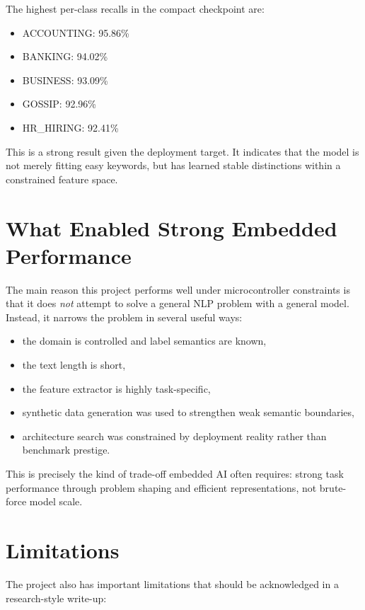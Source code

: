 \documentclass[11pt,a4paper]{article}
\begin{document}
The highest per-class recalls in the compact checkpoint are:

\begin{itemize}
    \item ACCOUNTING: 95.86\%
    \item BANKING: 94.02\%
    \item BUSINESS: 93.09\%
    \item GOSSIP: 92.96\%
    \item HR\_HIRING: 92.41\%
\end{itemize}

This is a strong result given the deployment target. It indicates that the model is not merely fitting easy keywords, but has learned stable distinctions within a constrained feature space.

\section{What Enabled Strong Embedded Performance}

The main reason this project performs well under microcontroller constraints is that it does \emph{not} attempt to solve a general NLP problem with a general model. Instead, it narrows the problem in several useful ways:

\begin{itemize}
    \item the domain is controlled and label semantics are known,
    \item the text length is short,
    \item the feature extractor is highly task-specific,
    \item synthetic data generation was used to strengthen weak semantic boundaries,
    \item architecture search was constrained by deployment reality rather than benchmark prestige.
\end{itemize}

This is precisely the kind of trade-off embedded AI often requires: strong task performance through problem shaping and efficient representations, not brute-force model scale.

\section{Limitations}

The project also has important limitations that should be acknowledged in a research-style write-up:
\end{document}
